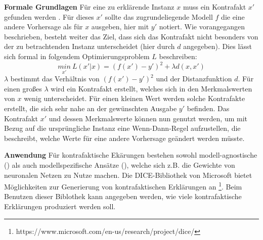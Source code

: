 \textbf{Formale Grundlagen}
Für eine zu erklärende Instanz $x$ muss ein Kontrafakt $x'$ gefunden werden \cite{kamath2021explainable}. Für dieses $x'$ sollte das zugrundeliegende Modell $f$ die eine andere Vorhersage als für $x$ ausgeben, hier mit $y'$ notiert. Wie vorangegangen beschrieben, besteht weiter das Ziel, dass sich das Kontrafakt nicht besonders von der zu betrachtenden Instanz unterscheidet (hier durch $d$ angegeben). Dies lässt sich formal in folgendem Optimierungsproblem $L$ beschreiben\cite{kamath2021explainable}:
\begin{equation}
    \underset{x'}{min} \: L(x'|x) = (f(x')-y')^2 + \lambda d(x, x')
\end{equation}
$\lambda$ bestimmt das Verhältnis von $(f(x')-y')^2$ und der Distanzfunktion $d$. Für einen großes $\lambda$ wird ein Kontrafakt erstellt, welches sich in den Merkmalswerten von $x$ wenig unterscheidet. Für einen kleinen Wert werden solche Kontrafakte erstellt, die sich sehr nahe an der gewünschten Ausgabe $y'$ befinden. Das Kontrafakt $x'$ und dessen Merkmalswerte können nun genutzt werden, um mit Bezug auf die ursprüngliche Instanz eine Wenn-Dann-Regel aufzustellen, die beschreibt, welche Werte für eine andere Vorhersage geändert werden müsste.




\textbf{Anwendung}
Für kontrafaktische Ekärungen bestehen sowohl modell-agnostische (\cite{dhurandhar2019model, guidotti2018local}) als auch modellspezifische Ansätze (\textcite{wachter2017counterfactual, mothilal2020explaining}), welche sich z.B. die Gewichte von neuronalen Netzen zu Nutze machen. Die DICE-Bibliothek von Microsoft bietet Möglichkeiten zur Generierung von kontrafaktischen Erklärungen an \footnote{https://www.microsoft.com/en-us/research/project/dice/}. Beim Benutzen dieser Biblothek kann angegeben werden, wie viele kontrafaktische Erklärungen produziert werden soll.


